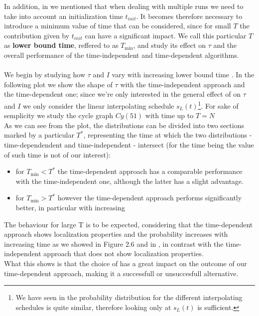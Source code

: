         \noindent
        In addition, in   we mentioned that when dealing with multiple runs we need to take into account an initialization time $t_{init}$. It becomes therefore necessary to introduce a minimum value of time that can be considered, since for small $T$ the contribution given by $t_{init}$ can have a significant impact. We call this particular $T$ as \textbf{lower bound time}, reffered to as $T_{\min}$, and study its effect on $\tau$ and the overall performance of the time-independent and time-dependent algorithms. \\ \\

         We begin by studying how $\tau$ and $I$ vary with increasing lower bound time \tmin.
         In the following plot we show the shape of $\tau$ with the time-independent approach and the time-dependent one; since we're only interested in the general effect of \tmin on $\tau$ and $I$ we only consider the linear interpolating schedule $s_L(t)$\footnote{We have seen in  the probability distribution for the different interpolating schedules is quite similar, therefore looking only at $s_L(t)$ is sufficient.}. For sake of semplicity we study the cycle graph $Cy(51)$ with time up to $T=N$\\
         

        As we can see from the plot, the distributions can be divided into two sections marked by a particular $T^*$, representing the time at which the two distributions - time-dependendent and time-independent - intersect (for the time being the value of such time is not of our interest):
        \begin{itemize}
            \item for $T_{\min}<T^*$ the time-dependent approach has a comparable performance with the time-independent one, although the latter has a slight advantage.
            \item for $T_{\min}>T^*$ however the time-dependent approach performs significantly better, in particular with increasing \tmin
        \end{itemize}
        The behaviour for large T is to be expected, considering that the time-dependent approach shows localization properties and the probability increases with increasing time as we showed in Figure 2.6 and in , in contrast with the time-independent approach that does not show localization properties.\\ What this shows is that the choice of \tmin has a great impact on the outcome of our time-dependent approach, making it a successfull or unsuccesfull alternative. \\


